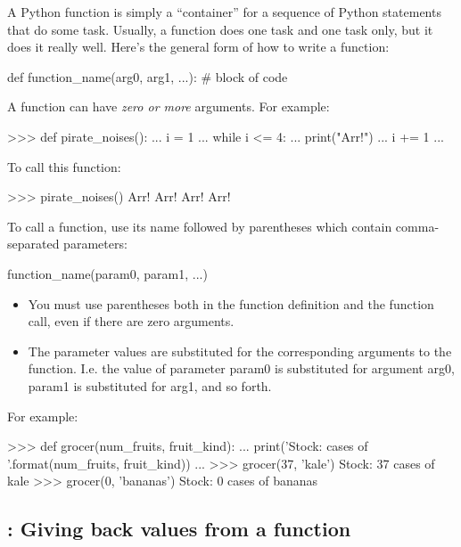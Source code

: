 \documentclass[11pt]{cselabheader}
\begin{document}
{A Python function is simply a ``container'' for a sequence of Python statements
that do some task. Usually, a function does one task and one task only, but it
does it really well. Here's the general form of how to write a function:

\begin{python3code}
def function_name(arg0, arg1, ...):
    # block of code
\end{python3code}

A function can have \emph{zero or more} arguments. For example:

\begin{pyconcode}
>>> def pirate_noises():
...     i = 1
...     while i <= 4:
...         print("Arr!")
...         i += 1
...
\end{pyconcode}

To call this function:

\begin{pyconcode}
>>> pirate_noises()
Arr!
Arr!
Arr!
Arr!
\end{pyconcode}

To call a function, use its name followed by parentheses which contain
comma-separated parameters:

\begin{python3code}
function_name(param0, param1, ...)
\end{python3code}

\begin{itemize}
  \item You must use parentheses both in the function definition and the function
    call, even if there are zero arguments.
  \item The parameter values are substituted for the corresponding arguments to
    the function. I.e. the value of parameter param0 is substituted for argument
    arg0, param1 is substituted for arg1, and so forth.
\end{itemize}

For example:

\begin{pyconcode}
>>> def grocer(num_fruits, fruit_kind):
...     print('Stock: {} cases of {}'.format(num_fruits, fruit_kind))
...
>>> grocer(37, 'kale')
Stock: 37 cases of kale
>>> grocer(0, 'bananas')
Stock: 0 cases of bananas
\end{pyconcode}

\subsection{\protect{}: Giving back values from a function}

}
\end{document}

